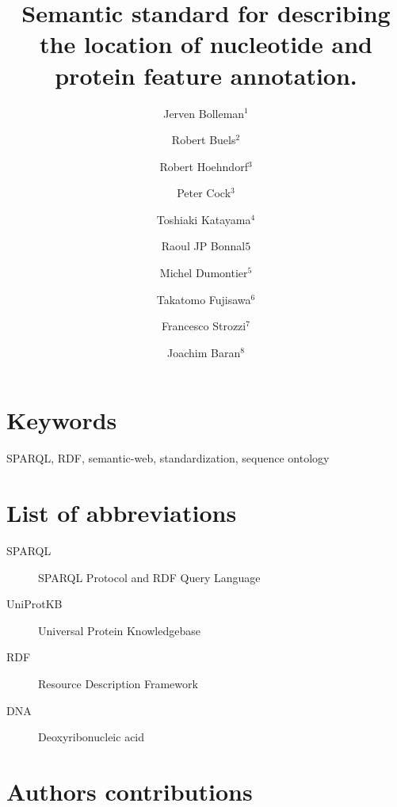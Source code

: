 \documentclass[10pt]{bmc_article}
\newenvironment{bmcformat}{\begin{raggedright}\baselineskip20pt\sloppy\setboolean{publ}{false}}{\end{raggedright}\baselineskip20pt\sloppy}
\begin{document}
\begin{bmcformat}
\title{Semantic standard for describing the location of nucleotide and protein feature annotation.}
\author{Jerven Bolleman\correspondingauthor$^1$  
         \and Robert Buels$^2$%
         \and Robert Hoehndorf$^3$%
         \and Peter Cock$^3$ %
		 \and Toshiaki Katayama$^4$ %
		 \and Raoul JP Bonnal$5$ %
		 \and Michel Dumontier$^5$ %
		 \and Takatomo Fujisawa$^6$ %
		 \and Francesco Strozzi$^7$ %
		 \and Joachim Baran$^8$ %
         }
\address{
    \iid(1)SIB Swiss Institute of Bioinformatics, Centre Medical Universitaire, 1 rue Michel
Servet, 1211 Geneva 4, Switzerland,
 \iid(2) University of California, Berkeley, Berkeley, CA, USA,
 \iid(3) fill in,
 \iid(4) fill in,
 \iid(5) Integrative Biology Program, Istituto Nazionale Genetica Molecolare, Milan, Italy,
 \iid(6) fill in,
 \iid(7) fill in, and
 \iid(8) fill in.
        }
\maketitle


\section*{Keywords}
SPARQL, RDF, semantic-web, standardization, sequence ontology









\section*{List of abbreviations}

\begin{description}
\item[SPARQL] SPARQL Protocol and RDF Query Language
\item[UniProtKB] Universal Protein Knowledgebase 
\item[RDF] Resource Description Framework
\item[DNA] Deoxyribonucleic acid
\end{description}
\bigskip

\section*{Authors contributions}


\end{bmcformat}
\end{document}
